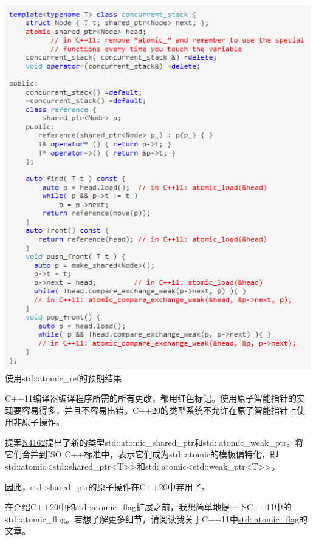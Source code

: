 \begin{center}
\includegraphics[width=1.0\textwidth]{content/3/chapter6/images/11.png} \\
使用std::atomic\_ref的预期结果
\end{center}

C++11编译器编译程序所需的所有更改，都用红色标记。使用原子智能指针的实现要容易得多，并且不容易出错。C++20的类型系统不允许在原子智能指针上使用非原子操作。

提案\href{http://wg21.link/n4162}{N4162}提出了新的类型std::atomic\_shared\_ptr和std::atomic\_weak\_ptr。将它们合并到ISO C++标准中，表示它们成为std::atomic的模板偏特化，即std::atomic<std::shared\_ptr<T>{}>和std::atomic<std::weak\_ptr<T>{}>。

因此，std::shared\_ptr的原子操作在C++20中弃用了。


在介绍C++20中的std::atomic\_flag扩展之前，我想简单地提一下C++11中的std::atomic\_flag。若想了解更多细节，请阅读我关于C++11中\href{https://www.modernescpp.com/index.php/the-atomic-flag}{std::atomic\_flag}的文章。

